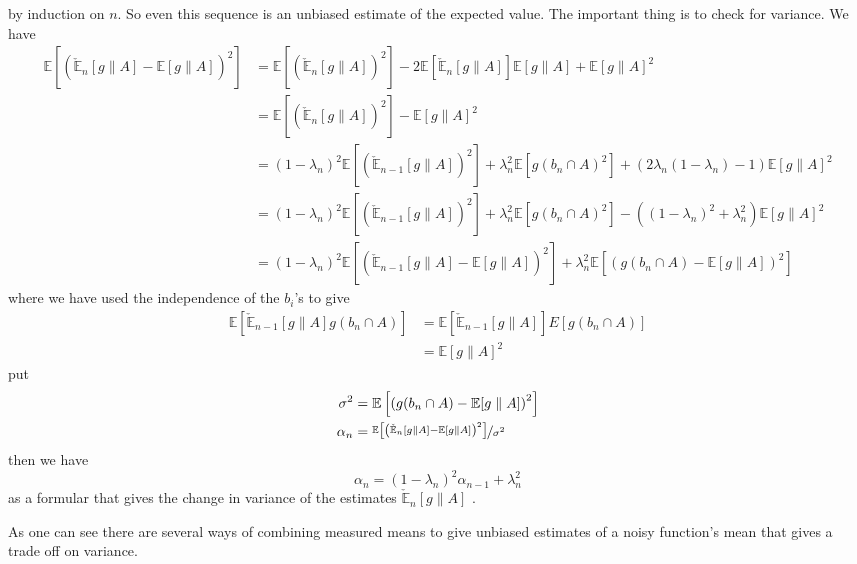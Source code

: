 \documentclass[a4paper,oneside,english]{article}
\numberwithin{equation}{section}
\numberwithin{figure}{section}
\begin{document}
by induction on $n$. So even this sequence is an unbiased estimate
of the expected value. The important thing is to check for variance.
We have
\begin{align*}
\mathbb{E}\left[\left(\mathbb{\check{E}}_{n}[g\parallel A]-\mathbb{E}[g\parallel A]\right)^{2}\right] & = \mathbb{E}\left[\left(\mathbb{\check{E}}_{n}[g\parallel A]\right)^{2}\right]-2\mathbb{E}\left[\mathbb{\check{E}}_{n}[g\parallel A]\right]\mathbb{E}[g\parallel A]+\mathbb{E}[g\parallel A]^{2}\\
& = \mathbb{E}\left[\left(\mathbb{\check{E}}_{n}[g\parallel A]\right)^{2}\right]-\mathbb{E}[g\parallel A]^{2}\\
& = (1-\lambda_{n})^{2}\mathbb{E}\left[\left(\mathbb{\check{E}}_{n-1}[g\parallel A]\right)^{2}\right]+\lambda_{n}^{2}\mathbb{E}\left[g(b_{n}\cap A)^{2}\right]+(2\lambda_{n}(1-\lambda_{n})-1)\mathbb{E}[g\parallel A]^{2}\\
& = (1-\lambda_{n})^{2}\mathbb{E}\left[\left(\mathbb{\check{E}}_{n-1}[g\parallel A]\right)^{2}\right]+\lambda_{n}^{2}\mathbb{E}\left[g(b_{n}\cap A)^{2}\right]-((1-\lambda_{n})^{2}+\lambda_{n}^{2})\mathbb{E}[g\parallel A]^{2}\\
& = (1-\lambda_{n})^{2}\mathbb{E}\left[\left(\mathbb{\check{E}}_{n-1}[g\parallel A]-\mathbb{E}[g\parallel A]\right)^{2}\right]+\lambda_{n}^{2}\mathbb{E}\left[\left(g(b_{n}\cap A)-\mathbb{E}[g\parallel A]\right)^{2}\right]
\end{align*}
where we have used the independence of the $b_{i}$'s to give
\begin{align*}
\mathbb{E}\left[\mathbb{\check{E}}_{n-1}[g\parallel A]g(b_{n}\cap A)\right] & = \mathbb{E}\left[\check{\mathbb{E}}_{n-1}[g\parallel A]\right]E\left[g(b_{n}\cap A)\right]\\
& = \mathbb{E}[g\parallel A]^{2}
\end{align*}
put
\begin{align*}
\sigma^{2} & = \mathbb{E}\left[\left(g(b_{n}\cap A)-\mathbb{E}[g\parallel A]\right)^{2}\right]\\
\alpha_{n} & = \nicefrac{\mathbb{E}\left[\left(\mathbb{\check{E}}_{n}[g\parallel A]-\mathbb{E}[g\parallel A]\right)^{2}\right]}{\sigma^{2}}
\end{align*}
then we have
\[
\alpha_{n}=(1-\lambda_{n})^{2}\alpha_{n-1}+\lambda_{n}^{2}
\]
as a formular that gives the change in variance of the estimates $\check{\mathbb{E}}_{n}[g\parallel A]$
.

As one can see there are several ways of combining measured means to give unbiased estimates of a noisy function's mean that gives a trade off on variance.
 
\end{document}
